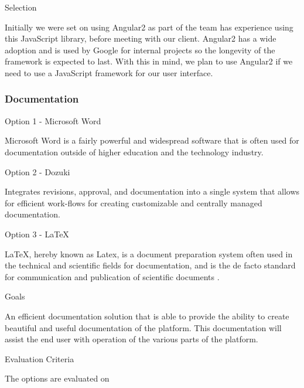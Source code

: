 \documentclass[letterpaper, 10pt, draftclsnofoot, compsoc, onecolumn]{IEEEtran}
\begin{document}
{\medskip
{\noindent Selection \par}
{\noindent Initially we were set on using Angular2 as part of the team has experience using this JavaScript library, before meeting with our client. Angular2 has a wide adoption and is used by Google for internal projects so the longevity of the framework is expected to last. With this in mind, we plan to use Angular2 if we need to use a JavaScript framework for our user interface. \par}




\newpage
\subsubsection{Documentation}
{\noindent Option 1 - Microsoft Word \cite{Word} \par}
{\noindent  Microsoft Word is a fairly powerful and widespread software that is often used for documentation outside of higher education and the technology industry. \par}

\medskip
{\noindent Option 2 - Dozuki \cite{Dozuki} \par}
{\noindent Integrates revisions, approval, and documentation into a single system that allows for efficient work-flows for creating customizable and centrally managed documentation. \par}

\medskip
{\noindent Option 3 - LaTeX \cite{Latex} \par}
{\noindent  LaTeX, hereby known as Latex, is a document preparation system often used in the technical and scientific fields for documentation, and is the de facto standard for communication and publication of scientific documents \cite{Latex}. \par}

\medskip
{\noindent Goals \par}
{\noindent An efficient documentation solution that is able to provide the ability to create beautiful and useful documentation of  the platform. This documentation will assist the end user with operation of the various parts of the platform.\par}

\medskip
\newpage
{\noindent Evaluation Criteria \par}
{\noindent The options are evaluated on 

}}
\end{document}
